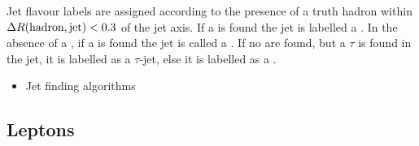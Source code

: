 Jet flavour labels are assigned according to the presence of a truth hadron within ${\Delta R(\text{hadron},\text{jet})<0.3}$ of the jet axis. If a \bhadron is found the jet is labelled a \bjet. In the absence of a \bhadron, if a \chadron is found the jet is called a \cjet.
If no \borchadrons are found, but a $\tau$ is found in the jet, it is labelled as a $\tau$-jet, else it is labelled as a \ljet.


\begin{itemize}
  \item Jet finding algorithms
\end{itemize}



\subsection{Leptons}\label{sec:leptons}
